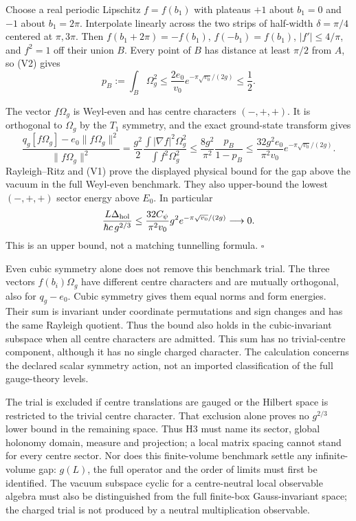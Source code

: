 \documentclass[11pt,a4paper]{article}
\begin{document}
Choose a real periodic Lipschitz \(f=f(b_1)\) with plateaus \(+1\) about
\(b_1=0\) and \(-1\) about \(b_1=2\pi\). Interpolate linearly across the
two strips of half-width \(\delta=\pi/4\) centered at \(\pi,3\pi\). Then
\(f(b_1+2\pi)=-f(b_1)\), \(f(-b_1)=f(b_1)\), \(|f'|\le4/\pi\), and
\(f^2=1\) off their union \(B\). Every point of \(B\) has distance at
least \(\pi/2\) from \(A\), so (V2) gives
\[p_B:=\int_B\Omega_g^2\le\frac{2e_0}{v_0}
 e^{-\pi\sqrt{v_0}/(2g)}\le\frac12.\]

The vector \(f\Omega_g\) is Weyl-even and has centre characters
\((-,+,+)\). It is orthogonal to \(\Omega_g\) by the \(T_1\) symmetry,
and the exact ground-state transform gives
\[\frac{q_g[f\Omega_g]-e_0\|f\Omega_g\|^2}
 {\|f\Omega_g\|^2}
=\frac{g^2}{2}\frac{\int|\nabla f|^2\Omega_g^2}{\int f^2\Omega_g^2}
\le\frac{8g^2}{\pi^2}\frac{p_B}{1-p_B}
\le\frac{32g^2e_0}{\pi^2v_0}
 e^{-\pi\sqrt{v_0}/(2g)}.\] Rayleigh--Ritz and (V1) prove the displayed
physical bound for the gap above the vacuum in the full Weyl-even
benchmark. They also upper-bound the lowest \((-,+,+)\) sector energy
above \(E_0\). In particular
\[\frac{L\Delta_{\rm hol}}{\hbar c\,g^{2/3}}
\le\frac{32C_\psi}{\pi^2v_0}g^2e^{-\pi\sqrt{v_0}/(2g)}\longrightarrow0.\]
This is an upper bound, not a matching tunnelling formula. \(\square\)

Even cubic symmetry alone does not remove this benchmark trial. The
three vectors \(f(b_i)\Omega_g\) have different centre characters and
are mutually orthogonal, also for \(q_g-e_0\). Cubic symmetry gives them
equal norms and form energies. Their sum is invariant under coordinate
permutations and sign changes and has the same Rayleigh quotient. Thus
the bound also holds in the cubic-invariant subspace when all centre
characters are admitted. This sum has no trivial-centre component,
although it has no single charged character. The calculation concerns
the declared scalar symmetry action, not an imported classification of
the full gauge-theory levels.

The trial is excluded if centre translations are gauged or the Hilbert
space is restricted to the trivial centre character. That exclusion
alone proves no \(g^{2/3}\) lower bound in the remaining space. Thus H3
must name its sector, global holonomy domain, measure and projection; a
local matrix spacing cannot stand for every centre sector. Nor does this
finite-volume benchmark settle any infinite-volume gap: \(g(L)\), the
full operator and the order of limits must first be identified. The
vacuum subspace cyclic for a centre-neutral local observable algebra
must also be distinguished from the full finite-box Gauss-invariant
space; the charged trial is not produced by a neutral multiplication
observable.
\end{document}
